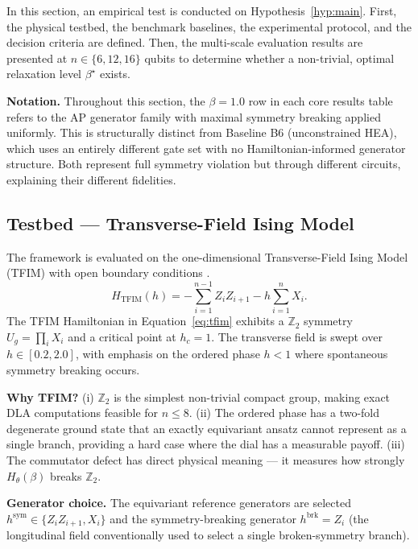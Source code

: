 \documentclass[pdflatex,sn-mathphys-num]{sn-jnl}
\theoremstyle{thmstyleone}
\theoremstyle{thmstyletwo}
\theoremstyle{thmstylethree}
\begin{document}
In this section, an empirical test is conducted on Hypothesis~\ref{hyp:main}. First, the physical testbed, the benchmark baselines, the experimental protocol, and the decision criteria are defined. Then, the multi-scale evaluation results are presented at $n \in \{6, 12, 16\}$ qubits to determine whether a non-trivial, optimal relaxation level $\beta^\star$ exists.

\textbf{Notation.} Throughout this section, the $\beta=1.0$ row in each core results table refers to the AP generator family with maximal symmetry breaking applied uniformly. This is structurally distinct from Baseline B6 (unconstrained HEA), which uses an entirely different gate set with no Hamiltonian-informed generator structure. Both represent full symmetry violation but through different circuits, explaining their different fidelities.

\subsection{Testbed --- Transverse-Field Ising Model}

The framework is evaluated on the one-dimensional Transverse-Field Ising Model (TFIM) with open boundary conditions \cite{pfeuty1970one,sachdev2011quantum}.
\begin{equation}
H_{\text{TFIM}}(h) = -\sum_{i=1}^{n-1} Z_i Z_{i+1} - h \sum_{i=1}^n X_i.
\label{eq:tfim}
\end{equation}
The TFIM Hamiltonian in Equation~\eqref{eq:tfim} exhibits a $\mathbb{Z}_2$ symmetry $U_g = \prod_i X_i$ and a critical point at $h_c = 1$. The transverse field is swept over $h \in [0.2, 2.0]$, with emphasis on the ordered phase $h < 1$ where spontaneous symmetry breaking occurs.

\textbf{Why TFIM?} (i) $\mathbb{Z}_2$ is the simplest non-trivial compact group, making exact DLA computations feasible for $n \le 8$. (ii) The ordered phase has a two-fold degenerate ground state that an exactly equivariant ansatz cannot represent as a single branch, providing a hard case where the dial has a measurable payoff. (iii) The commutator defect has direct physical meaning --- it measures how strongly $H_\theta(\beta)$ breaks $\mathbb{Z}_2$.

\textbf{Generator choice.} The equivariant reference generators are selected $h^{\text{sym}} \in \{Z_i Z_{i+1}, X_i\}$ and the symmetry-breaking generator $h^{\text{brk}} = Z_i$ (the longitudinal field conventionally used to select a single broken-symmetry branch).
\end{document}
